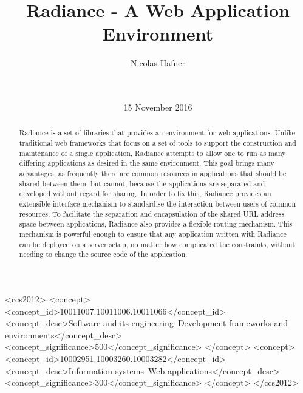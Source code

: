 \documentclass{sig-alternate}
\begin{document}
\doi{}
\isbn{}

\begin{CCSXML}
<ccs2012>
  <concept>
    <concept_id>10011007.10011006.10011066</concept_id>
    <concept_desc>Software and its engineering~Development frameworks and environments</concept_desc>
    <concept_significance>500</concept_significance>
  </concept>
  <concept>
    <concept_id>10002951.10003260.10003282</concept_id>
    <concept_desc>Information systems~Web applications</concept_desc>
    <concept_significance>300</concept_significance>
  </concept>
</ccs2012>
\end{CCSXML}


\title{Radiance - A Web Application Environment}

\author{
\alignauthor
Nicolas Hafner\\
       \\
       \\
}
\date{15 November 2016}

\maketitle

\begin{abstract}
  Radiance\cite{radiance} is a set of libraries that provides an environment for web applications. Unlike traditional web frameworks that focus on a set of tools to support the construction and maintenance of a single application, Radiance attempts to allow one to run as many differing applications as desired in the same environment. This goal brings many advantages, as frequently there are common resources in applications that should be shared between them, but cannot, because the applications are separated and developed without regard for sharing. In order to fix this, Radiance provides an extensible interface mechanism to standardise the interaction between users of common resources. To facilitate the separation and encapsulation of the shared URL address space between applications, Radiance also provides a flexible routing mechanism. This mechanism is powerful enough to ensure that any application written with Radiance can be deployed on a server setup, no matter how complicated the constraints, without needing to change the source code of the application.
\end{abstract}
\end{document}
